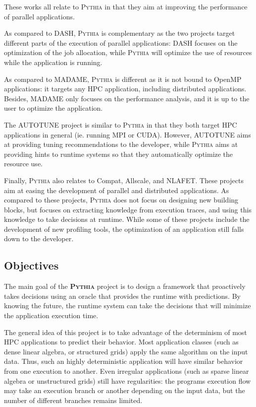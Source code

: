 \documentclass[a4paper,11pt,defblank]{article}
\newcommand{\pname}{\textsc{Pythia}\xspace}
\begin{document}
These works all relate to \pname in that they aim at improving the
performance of parallel applications.

As compared to DASH, \pname is complementary as the two projects target
different parts of the execution of parallel applications: DASH
focuses on the optimization of the job allocation, while \pname will
optimize the use of resources while the application is running.

As compared to MADAME, \pname is different as it is not bound to
OpenMP applications: it targets any HPC application, including
distributed applications. Besides, MADAME only focuses on the
performance analysis, and it is up to the user to optimize the
application.

The AUTOTUNE project is similar to \pname in that they both target HPC
applications in general (ie. running MPI or CUDA). However, AUTOTUNE
aims at providing tuning recommendations to the developer, while
\pname aims at providing hints to runtime systems so that they
automatically optimize the resource use.

Finally, \pname also relates to Compat, Allscale, and NLAFET. These
projects aim at easing the development of parallel and distributed
applications. As compared to these projects, \pname does not focus on
designing new building blocks, but focuses on extracting knowledge
from execution traces, and using this knowledge to take decisions at
runtime. While some of these projects include the development of new
profiling tools, the optimization of an application still falls down
to the developer.

\subsection{Objectives}

The main goal of the \textbf{\pname} project is to design
a framework that proactively takes decisions using an oracle that
provides the runtime with predictions. By knowing the future, the
runtime system can take the decisions that will minimize the
application execution time.

The general idea of this project is to take advantage of the
determinism of most HPC applications to predict their behavior. Most
application classes \cite{dwarfs} (such as dense linear algebra, or
structured grids) apply the same algorithm on the input data. Thus,
such an highly deterministic application will have similar behavior
from one execution to another. Even irregular applications (such
as sparse linear algebra or unstructured grids) still have
regularities: the programs execution flow may take an execution branch
or another depending on the input data, but the number of different
branches remains limited.
\end{document}

